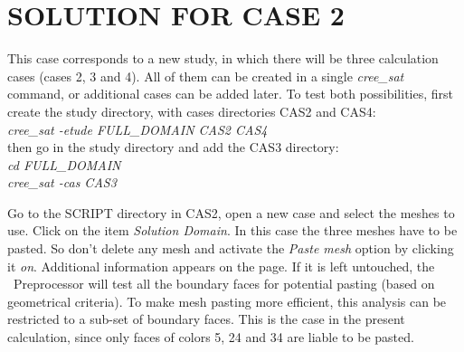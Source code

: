 %
%
%
%
%
%
%
\section{SOLUTION FOR CASE 2}
This case corresponds to a new study, in which there will be three calculation
cases (cases 2, 3 and 4). All of them can be created in a single {\itshape
cree\_sat} command, or additional cases can be added later. To test both
possibilities, first create the study directory, with cases directories CAS2
and CAS4:\\
{\itshape cree\_sat -etude FULL\_DOMAIN CAS2 CAS4}\\
then go in the study directory and add the CAS3 directory:\\
{\itshape cd FULL\_DOMAIN}\\
{\itshape cree\_sat -cas CAS3}

Go to the SCRIPT directory in CAS2,
open a new case and select the meshes to use. Click on the
item {\itshape Solution Domain}. In this case the three meshes have to be
pasted. So don't delete any mesh and activate the {\itshape Paste mesh} option by
clicking it {\itshape on}. Additional information appears on the page. If it is
left untouched, the \CS\ Preprocessor will test all the boundary faces for
potential pasting (based on geometrical criteria). To make mesh pasting more
efficient, this analysis can be restricted to a sub-set of boundary faces. This
is the case in the present calculation, since only faces of colors 5, 24 and 34
are liable to be pasted.


